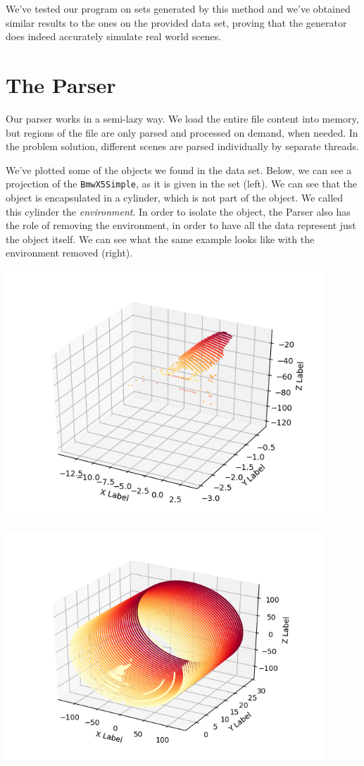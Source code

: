 \documentclass{article}
\begin{document}
	We've tested our program on sets generated by this method and we've obtained similar results to the ones on the provided data set, proving that the generator does indeed accurately simulate real world scenes.
	
	\section{The Parser}
	
	Our parser works in a semi-lazy way. We load the entire file content into memory, but regions of the file are only parsed and processed on demand, when needed. In the problem solution, different scenes are parsed individually by separate threads.
	
	We've plotted some of the objects we found in the data set. Below, we can see a projection of the \texttt{BmwX5Simple}, as it is given in the set (left). We can see that the object is encapsulated in a cylinder, which is not part of the object. We called this cylinder the \textit{environment}. In order to isolate the object, the Parser also has the role of removing the environment, in order to have all the data represent just the object itself. We can see what the same example looks like with the environment removed (right).
	
		\includegraphics[width=0.9\textwidth]{img_nowall.png}
		
		\includegraphics[width=0.9\textwidth]{img_wall.png}
	
\end{document}
